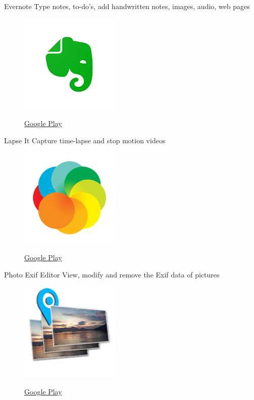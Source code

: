 \documentclass[serif,14pt,color=usenames,dvipsnames]{beamer}
\begin{document}
\begin{frame}{Evernote}
  Type notes, to-do's, add handwritten notes, images, audio, web pages

  \begin{figure}
  \centering
  \includegraphics[width=0.4\linewidth]{imgs/evernote}

  \href{https://play.google.com/store/apps/details?id=com.evernote}{Google
  Play }
  \end{figure}
\end{frame}

\begin{frame}{Lapse It}
Capture time-lapse and stop motion videos

  \begin{figure}
  \centering
  \includegraphics[width=0.4\linewidth]{imgs/lapseit}

  \href{https://play.google.com/store/apps/details?id=com.ui.LapseIt}{Google
  Play }
  \end{figure}
\end{frame}

\begin{frame}{Photo Exif Editor}
View, modify and remove the Exif data of pictures

  \begin{figure}
  \centering
  \includegraphics[width=0.3\linewidth]{imgs/peep}

  \href{https://play.google.com/store/apps/details?id=net.xnano.android.photoexifeditor}{Google
  Play }
  \end{figure}
\end{frame}
\end{document}
